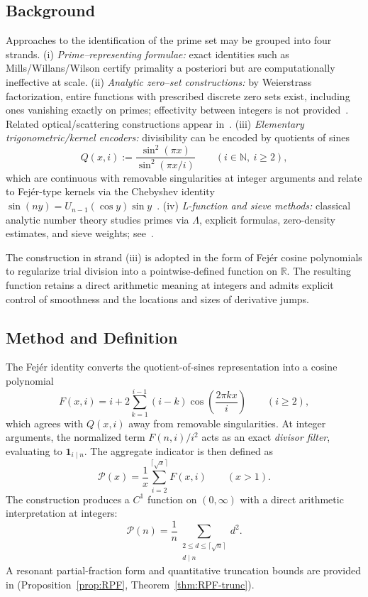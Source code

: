 \documentclass[11pt,a4paper]{amsart}
\theoremstyle{plain}
\theoremstyle{definition}
\theoremstyle{remark}
\begin{document}
\subsection*{Background}
Approaches to the identification of the prime set may be grouped into four strands.
(i) \emph{Prime–representing formulae:} exact identities such as Mills/Willans/Wilson certify primality a posteriori but are computationally ineffective at scale.
(ii) \emph{Analytic zero–set constructions:} by Weierstrass factorization, entire functions with prescribed discrete zero sets exist, including ones vanishing exactly on primes; effectivity between integers is not provided~\cite{boas1954}. Related optical/scattering constructions appear in~\cite{petersen2019,li2019-optical,zhang2018-structure,torquato2018-scattering}.
(iii) \emph{Elementary trigonometric/kernel encoders:} divisibility can be encoded by quotients of sines
\[
Q(x,i):=\frac{\sin^2(\pi x)}{\sin^2(\pi x/i)}\qquad(i\in\mathbb N,\ i\ge2),
\]
which are continuous with removable singularities at integer arguments and relate to Fejér-type kernels via the Chebyshev identity \(\sin(ny)=U_{n-1}(\cos y)\sin y\)~\cite{katznelson2004,zygmund2002}.
(iv) \emph{L-function and sieve methods:} classical analytic number theory studies primes via \(\Lambda\), explicit formulas, zero-density estimates, and sieve weights; see~\cite{iwaniec2004,montgomery2007}.  

The construction in strand (iii) is adopted in the form of Fejér cosine polynomials to regularize trial division into a pointwise-defined function on $\mathbb{R}$. The resulting function retains a direct arithmetic meaning at integers and admits explicit control of smoothness and the locations and sizes of derivative jumps.

\subsection*{Method and Definition}
The Fejér identity converts the quotient-of-sines representation into a cosine polynomial
\[
F(x,i)=i+2\sum_{k=1}^{i-1}(i-k)\cos\!\left(\frac{2\pi k x}{i}\right)\qquad(i\ge2),
\]
which agrees with \(Q(x,i)\) away from removable singularities. At integer arguments, the normalized term $F(n,i)/i^2$ acts as an exact \emph{divisor filter}, evaluating to $\mathbf{1}_{i\mid n}$. The aggregate indicator is then defined as
\[
\mathcal P(x)=\frac{1}{x}\sum_{i=2}^{\lceil\sqrt{x}\rceil} F(x,i)\qquad(x>1).
\]
The construction produces a \(C^1\) function on \((0,\infty)\) with a direct arithmetic interpretation at integers:
\[
\mathcal P(n)=\frac{1}{n}\sum_{\substack{2\le d\le \lceil\sqrt n\rceil\\ d\mid n}} d^2.
\]
A resonant partial-fraction form and quantitative truncation bounds are provided in (Proposition~\ref{prop:RPF}, Theorem~\ref{thm:RPF-trunc}).
\end{document}

